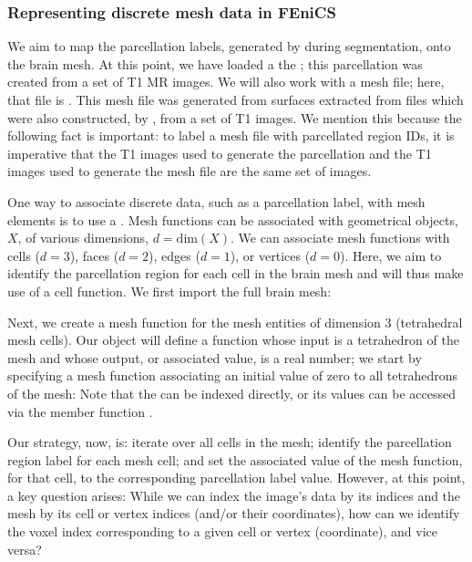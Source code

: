 \subsubsection*{Representing discrete mesh data in FEniCS}
We aim to map the parcellation labels, generated by \freesurfer{} during 
segmentation, onto the brain mesh.  At this point, we have loaded a 
the \freesurfer{} ; this parcellation was created from a 
set of T1 MR images.  We will also work with a mesh file; here, that 
file is .  This mesh file was generated from 
surfaces extracted from files which were also constructed, by \freesurfer{}, 
from a set of T1 images. We mention this because the following fact is 
important: to label a mesh file with parcellated region IDs, it is imperative 
that the T1 images used to generate the parcellation and the T1 images used 
to generate the mesh file are the same set of images. 
%


One way to associate discrete data, such as a parcellation label, with mesh 
elements is to use a {\fenics} .
Mesh functions can be associated with geometrical objects, $X$, of various 
dimensions, $d = \text{dim}(X)$.  We can associate mesh functions with cells 
($d=3$), faces ($d=2$), edges ($d=1$), or vertices ($d=0$). Here, 
we aim to identify the parcellation region for each cell in the brain mesh and 
will thus make use of a cell function. We first import the full brain mesh:

\noindent  Next, we create a mesh function for the mesh entities of dimension 
3 (tetrahedral mesh cells). Our  object will  
define a function whose input is a tetrahedron of the mesh and whose 
output, or associated value, is a real number; we start by specifying a 
mesh function associating an initial value of zero to all tetrahedrons of the 
mesh:  
Note that the  can be indexed directly, or its values can be
accessed via the member function .

Our strategy, now, is: iterate over all cells in the mesh; identify the 
parcellation region label for each mesh cell; and set the associated value 
of the mesh function, for that cell, to the corresponding parcellation label 
value.  %
However, at this point, a key question arises: While we can index the image's 
data by its indices and the mesh by its cell or vertex indices (and/or their 
coordinates), how can we identify the voxel index corresponding to a given 
cell or vertex (coordinate), and vice versa? 

